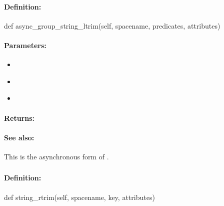 \paragraph{Definition:}
\begin{pythoncode}
def async_group_string_ltrim(self, spacename, predicates, attributes)
\end{pythoncode}

\paragraph{Parameters:}
\begin{itemize}[noitemsep]
\item {}\\

\item {}\\

\item {}\\

\end{itemize}

\paragraph{Returns:}


\paragraph{See also:}  This is the asynchronous form of .

\pagebreak
\subsubsection{}
\label{api:python:string_rtrim}


\paragraph{Definition:}
\begin{pythoncode}
def string_rtrim(self, spacename, key, attributes)
\end{pythoncode}

